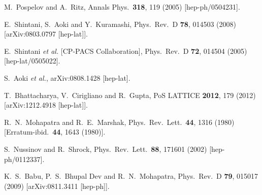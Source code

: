 \begin{thebibliography}{99}
  M.~Pospelov and A.~Ritz,
  Annals Phys.\  {\bf 318}, 119 (2005)
  [hep-ph/0504231].

  E.~Shintani, S.~Aoki and Y.~Kuramashi,
  Phys.\ Rev.\ D {\bf 78}, 014503 (2008)
  [arXiv:0803.0797 [hep-lat]].

  E.~Shintani {\it et al.} [CP-PACS Collaboration],
  Phys.\ Rev.\ D {\bf 72}, 014504 (2005)
  [hep-lat/0505022].

  S.~Aoki {\it et al.},
  arXiv:0808.1428 [hep-lat].

  T.~Bhattacharya, V.~Cirigliano and R.~Gupta,
  PoS LATTICE {\bf 2012}, 179 (2012)
  [arXiv:1212.4918 [hep-lat]].

  R.~N.~Mohapatra and R.~E.~Marshak,
  Phys.\ Rev.\ Lett.\  {\bf 44}, 1316 (1980)
  [Erratum-ibid.\  {\bf 44}, 1643 (1980)].

  S.~Nussinov and R.~Shrock,
  Phys.\ Rev.\ Lett.\  {\bf 88}, 171601 (2002)
  [hep-ph/0112337].

  K.~S.~Babu, P.~S.~Bhupal Dev and R.~N.~Mohapatra,
  Phys.\ Rev.\ D {\bf 79}, 015017 (2009)
  [arXiv:0811.3411 [hep-ph]].


\end{thebibliography}
